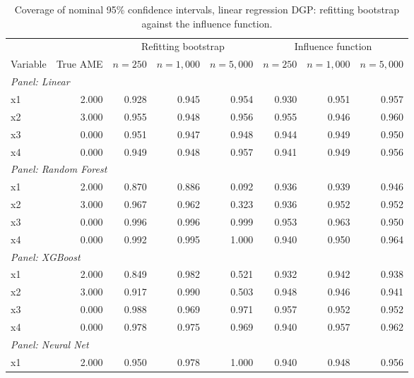 \documentclass[12pt,a4paper]{article}
\numberwithin{equation}{section}
\theoremstyle{plain}
\theoremstyle{definition}
\begin{document}
	\begin{table}[htbp]
		\centering
		\small
		\begin{threeparttable}
			\caption{Coverage of nominal 95\% confidence intervals, linear regression DGP: refitting bootstrap against the influence function.}
			\label{tab:sim3_coverage_regression_linear}
			\begin{tabular}{lrrrrrrr}
				\toprule
				& & \multicolumn{3}{c}{Refitting bootstrap} & \multicolumn{3}{c}{Influence function} \\
				\cmidrule(lr){3-5} \cmidrule(lr){6-8}
				Variable & True AME & $n=250$ & $n=1,000$ & $n=5,000$ & $n=250$ & $n=1,000$ & $n=5,000$ \\
				\midrule
				\multicolumn{8}{l}{\textit{Panel: Linear}} \\
				\quad x1 & 2.000 & 0.928 & 0.945 & 0.954 & 0.930 & 0.951 & 0.957 \\
				\quad x2 & 3.000 & 0.955 & 0.948 & 0.956 & 0.955 & 0.946 & 0.960 \\
				\quad x3 & 0.000 & 0.951 & 0.947 & 0.948 & 0.944 & 0.949 & 0.950 \\
				\quad x4 & 0.000 & 0.949 & 0.948 & 0.957 & 0.941 & 0.949 & 0.956 \\
				\midrule
				\multicolumn{8}{l}{\textit{Panel: Random Forest}} \\
				\quad x1 & 2.000 & 0.870 & 0.886 & 0.092 & 0.936 & 0.939 & 0.946 \\
				\quad x2 & 3.000 & 0.967 & 0.962 & 0.323 & 0.936 & 0.952 & 0.952 \\
				\quad x3 & 0.000 & 0.996 & 0.996 & 0.999 & 0.953 & 0.963 & 0.950 \\
				\quad x4 & 0.000 & 0.992 & 0.995 & 1.000 & 0.940 & 0.950 & 0.964 \\
				\midrule
				\multicolumn{8}{l}{\textit{Panel: XGBoost}} \\
				\quad x1 & 2.000 & 0.849 & 0.982 & 0.521 & 0.932 & 0.942 & 0.938 \\
				\quad x2 & 3.000 & 0.917 & 0.990 & 0.503 & 0.948 & 0.946 & 0.941 \\
				\quad x3 & 0.000 & 0.988 & 0.969 & 0.971 & 0.957 & 0.952 & 0.952 \\
				\quad x4 & 0.000 & 0.978 & 0.975 & 0.969 & 0.940 & 0.957 & 0.962 \\
				\midrule
				\multicolumn{8}{l}{\textit{Panel: Neural Net}} \\
				\quad x1 & 2.000 & 0.950 & 0.978 & 1.000 & 0.940 & 0.948 & 0.956 \\

\end{tabular}
\end{threeparttable}
\end{table}
\end{document}
